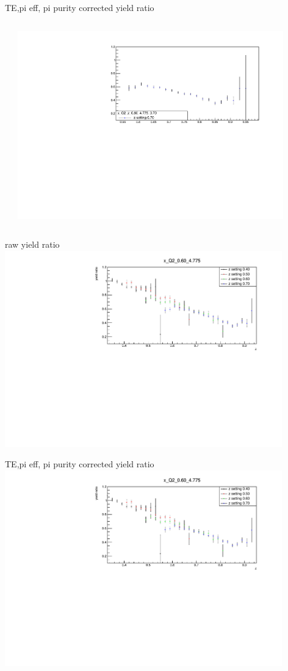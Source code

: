 \begin{frame}{TE,pi eff, pi purity corrected yield ratio}
\begin{columns}
\begin{column}[T]{0.5\textwidth}
\end{column}
\begin{column}[T]{0.5\textwidth}
\includegraphics[width = 0.9\textwidth]{results/yield/statistics_corr/x_Q2_z_0.60_4.775_0.70_ratio.pdf}
\end{column}
\end{columns}
\end{frame}
\begin{frame}{raw yield ratio}
\includegraphics[width = 0.9\textwidth]{results/yield/statistics/x_Q2_0.60_4.775_ratio.pdf}
\end{frame}
\begin{frame}{TE,pi eff, pi purity corrected yield ratio}
\includegraphics[width = 0.9\textwidth]{results/yield/statistics_corr/x_Q2_0.60_4.775_ratio.pdf}
\end{frame}
